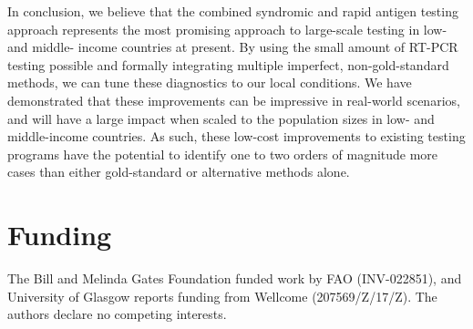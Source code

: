 \documentclass[]{elsarticle} %
\begin{document}
In conclusion, we believe that the combined syndromic and rapid antigen
testing approach represents the most promising approach to large-scale
testing in low- and middle- income countries at present. By using the
small amount of RT-PCR testing possible and formally integrating
multiple imperfect, non-gold-standard methods, we can tune these
diagnostics to our local conditions. We have demonstrated that these
improvements can be impressive in real-world scenarios, and will have a
large impact when scaled to the population sizes in low- and
middle-income countries. As such, these low-cost improvements to
existing testing programs have the potential to identify one to two
orders of magnitude more cases than either gold-standard or alternative
methods alone.

\hypertarget{funding}{%
\section{Funding}\label{funding}}

The Bill and Melinda Gates Foundation funded work by FAO (INV-022851),
and University of Glasgow reports funding from Wellcome (207569/Z/17/Z).
The authors declare no competing interests.
\end{document}
